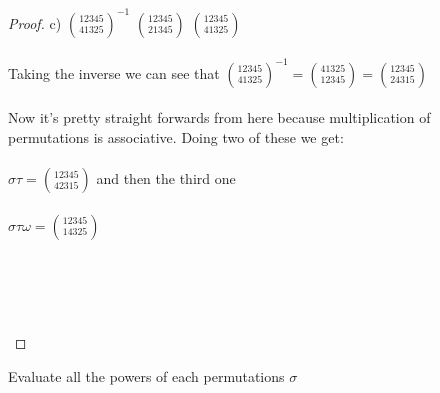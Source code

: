 \documentclass[12pt]{article}
\newenvironment{problem}[2][Problem]{\begin{trivlist}
\item[\hskip \labelsep {\bfseries #1}\hskip \labelsep {\bfseries #2.}]}{\end{trivlist}}
\begin{document}
\begin{proof}
\bigskip
c) $\displaystyle{1 2 3 4 5  \choose 41325}^{-1}$ $\displaystyle{12345 \choose 21345}$ $\displaystyle{12345 \choose 41325}$ \\ \\
Taking the inverse we can see that $\displaystyle{1 2 3 4 5  \choose 41325}^{-1} = \displaystyle{41325 \choose 12345} = \displaystyle{12345 \choose 24315}$ \\ \\
Now it's pretty straight forwards from here because multiplication of permutations is associative. Doing two of these we get: \\ \\
$\sigma \tau = \displaystyle{1 2 3 4 5  \choose 42315}$ and then the third one \\ \\
$\sigma \tau \omega = \displaystyle{1 2 3 4 5  \choose 14325}$ \\ \\ 
\centerline{} \\ \\ \\
\end{proof}

\begin{problem}{3.1.2}
Evaluate all the powers of each permutations $\sigma$
\end{problem}
\end{document}
